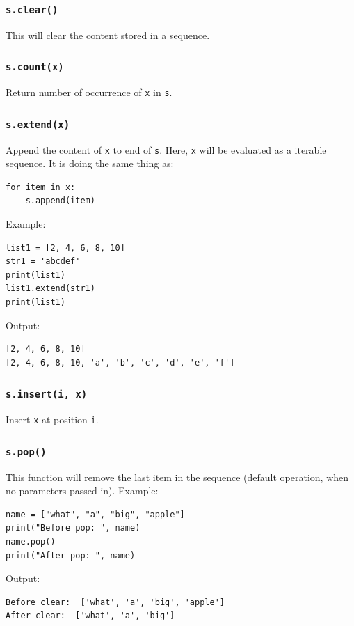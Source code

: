 \documentclass[12pt]{book}
\begin{document}
\subsubsection{\texttt{s.clear()}}
\label{sec:org607c28d}
This will clear the content stored in a sequence.
\subsubsection{\texttt{s.count(x)}}
\label{sec:org463a1b4}
Return number of occurrence of \texttt{x} in \texttt{s}.

\subsubsection{\texttt{s.extend(x)}}
\label{sec:org0381b63}
Append the content of \texttt{x} to end of \texttt{s}. Here, \texttt{x} will be evaluated as a iterable sequence. It is doing the same thing as:
\begin{verbatim}
for item in x:
    s.append(item)
\end{verbatim}
Example:
\begin{verbatim}
list1 = [2, 4, 6, 8, 10]
str1 = 'abcdef'
print(list1)
list1.extend(str1)
print(list1)
\end{verbatim}
Output:
\begin{verbatim}
[2, 4, 6, 8, 10]
[2, 4, 6, 8, 10, 'a', 'b', 'c', 'd', 'e', 'f']
\end{verbatim}

\subsubsection{\texttt{s.insert(i, x)}}
\label{sec:org2fe9991}
Insert \texttt{x} at position \texttt{i}.

\subsubsection{\texttt{s.pop()}}
\label{sec:orgb33e489}
This function will remove the last item in the sequence (default operation, when no parameters passed in). Example:
\begin{verbatim}
name = ["what", "a", "big", "apple"]
print("Before pop: ", name)
name.pop()
print("After pop: ", name)
\end{verbatim}
Output:
\begin{verbatim}
Before clear:  ['what', 'a', 'big', 'apple']
After clear:  ['what', 'a', 'big']
\end{verbatim}
\end{document}
